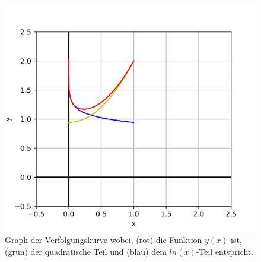\begin{figure}
	\centering
	\includegraphics{papers/lambertw/Bilder/VerfolgungskurveBsp.png}
	\caption[Graph der Verfolgungskurve]{Graph der Verfolgungskurve wobei, ({\color{red}rot}) die Funktion \ensuremath{y(x)} ist, ({\color{darkgreen}grün}) der quadratische Teil und ({\color{blue}blau}) dem \ensuremath{ln(x)}-Teil entspricht.
	\label{lambertw:funkLoes}
	}
\end{figure}

